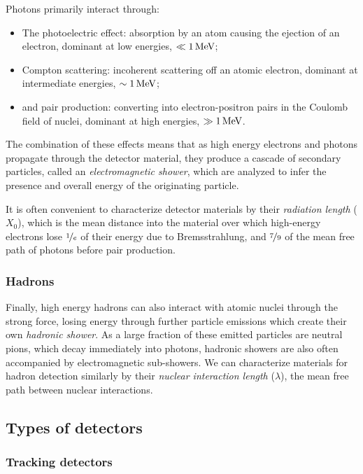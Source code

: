 Photons primarily interact through:
\begin{itemize}
    \item The photoelectric effect: absorption by an atom causing the ejection of an electron, dominant at low energies, $\ll 1\,\text{Me\hspace{-.08em}V}$;
    \item Compton scattering: incoherent scattering off an atomic electron, dominant at intermediate energies, $\sim 1\,\text{Me\hspace{-.08em}V}$;
    \item and pair production: converting into electron-positron pairs in the Coulomb field of nuclei, dominant at high energies, $\gg 1\,\text{Me\hspace{-.08em}V}$.
\end{itemize}
The combination of these effects means that as high energy electrons and photons propagate through the detector material, they produce a cascade of secondary particles, called an \textit{electromagnetic shower}, which are analyzed to infer the presence and overall energy of the originating particle.

It is often convenient to characterize detector materials by their \textit{radiation length} ($X_0$), which is the mean distance into the material over which high-energy electrons lose $\cnicefrac{1}{e}$ of their energy due to Bremsstrahlung, and $\cnicefrac{7}{9}$ of the mean free path of photons before pair production.

\subsubsection{Hadrons}

Finally, high energy hadrons can also interact with atomic nuclei through the strong force, losing energy through further particle emissions which create their own \textit{hadronic shower}.
As a large fraction of these emitted particles are neutral pions, which decay immediately into photons, hadronic showers are also often accompanied by electromagnetic sub-showers.
We can characterize materials for hadron detection similarly by their \textit{nuclear interaction length} ($\lambda$), the mean free path between nuclear interactions.

\subsection{Types of detectors}
\label{sec:02_cms_detecting_detectors}

\subsubsection{Tracking detectors}

